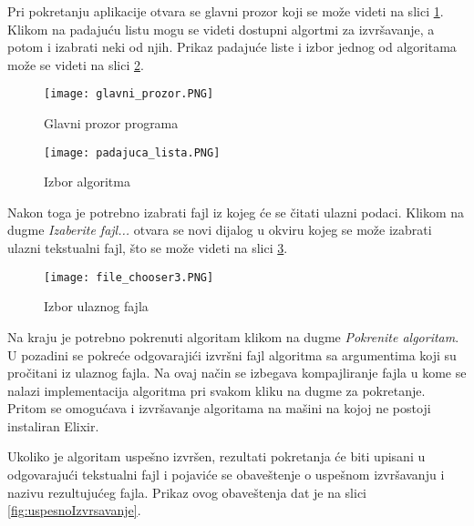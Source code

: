 \documentclass[12pt,oneside]{memoir}
\begin{document}
Pri pokretanju aplikacije otvara se glavni prozor koji se može videti na slici \ref{fig:glavniProzor}. Klikom na padajuću listu mogu se videti dostupni algortmi za izvršavanje, a potom i izabrati neki od njih. Prikaz padajuće liste i izbor jednog od algoritama može se videti na slici \ref{fig:padajucaLista}. 

\begin{figure}[h]
\centering
\texttt{[image: glavni\_prozor.PNG]}
\caption{Glavni prozor programa}
\label{fig:glavniProzor}
\end{figure}

\begin{figure}[h]
\centering
\texttt{[image: padajuca\_lista.PNG]}
\caption{Izbor algoritma}
\label{fig:padajucaLista}
\end{figure}

\noindent Nakon toga je potrebno izabrati fajl iz kojeg će se čitati ulazni podaci. Klikom na dugme \textit{Izaberite fajl...} otvara se novi dijalog u okviru kojeg se može izabrati ulazni tekstualni fajl, što se može videti na slici \ref{fig:fileChooser}.

\begin{figure}[h]
\centering
\texttt{[image: file\_chooser3.PNG]}
\caption{Izbor ulaznog fajla}
\label{fig:fileChooser}
\end{figure}

Na kraju je potrebno pokrenuti algoritam klikom na dugme \textit{Pokrenite algoritam}. U pozadini se pokreće odgovarajići izvršni fajl algoritma sa argumentima koji su pročitani iz ulaznog fajla. Na ovaj način se izbegava kompajliranje fajla u kome se nalazi implementacija algoritma pri svakom kliku na dugme za pokretanje. Pritom se omogućava i izvršavanje algoritama na mašini na kojoj ne postoji instaliran Elixir.

Ukoliko je algoritam uspešno izvršen, rezultati pokretanja će biti upisani u odgovarajući tekstualni fajl i pojaviće se obaveštenje o uspešnom izvršavanju i nazivu rezultujućeg fajla. Prikaz ovog obaveštenja dat je na slici \ref{fig:uspesnoIzvrsavanje}.


\end{document}
